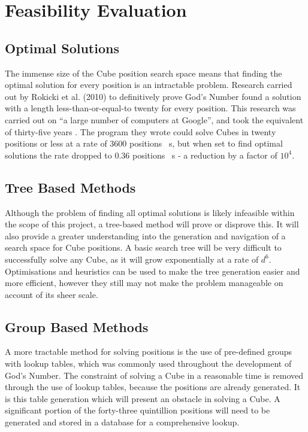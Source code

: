 \documentclass{report}
\begin{document}
    \section{Feasibility Evaluation}
    \subsection{Optimal Solutions}
    
	The immense size of the Cube position search space means that finding the optimal solution for every position is an intractable problem. Research carried out by Rokicki et al. (2010) to definitively prove God's Number found a solution with a length less-than-or-equal-to twenty for every position. This research was carried out on \enquote{a large number of computers at Google}, and took the equivalent of thirty-five years \cite{Rokicki2010}. The program they wrote could solve Cubes in twenty positions or less at a rate of 3600 positions \si{\per\second}, but when set to find optimal solutions the rate dropped to 0.36 positions \si{\per\second} - a reduction by a factor of $10^4$.
    
	\subsection{Tree Based Methods}
	
	Although the problem of finding all optimal solutions is likely infeasible within the scope of this project, a tree-based method will prove or disprove this. It will also provide a greater understanding into the generation and navigation of a search space for Cube positions. A basic search tree will be very difficult to successfully solve any Cube, as it will grow exponentially at a rate of $d^6$. Optimisations and heuristics can be used to make the tree generation easier and more efficient, however they still may not make the problem manageable on account of its sheer scale.
	
    \subsection{Group Based Methods}
    
    A more tractable method for solving positions is the use of pre-defined groups with lookup tables, which was commonly used throughout the development of God's Number. The constraint of solving a Cube in a reasonable time is removed through the use of lookup tables, because the positions are already generated. It is this table generation which will present an obstacle in solving a Cube. A significant portion of the forty-three quintillion positions will need to be generated and stored in a database for a comprehensive lookup.
    
\end{document}
